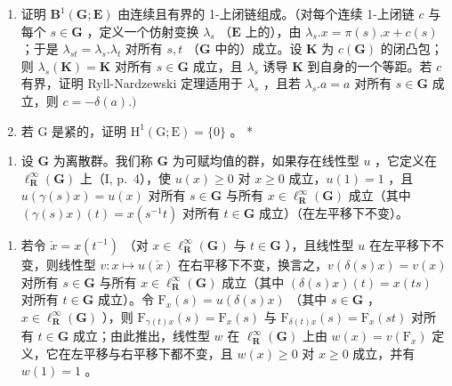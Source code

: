 \begin{enumerate}
\def\labelenumi{\alph{enumi})}
\item
  证明 \(\mathbf{B}^1 (\mathbf{G};\mathbf{E})\) 由连续且有界的 1-上闭链组成。（对每个连续 1-上闭链 \(c\) 与每个 \(s\in \mathbf{G}\) ，定义一个仿射变换 \(\lambda_{s}\) （\(\mathbf{E}\) 上的），由 \(\lambda_{s}.x = \pi (s).x + c(s)\) ；于是 \(\lambda_{st} = \lambda_s.\lambda_t\) 对所有 \(s,t\) （\(\mathbf{G}\) 中的）成立。设 \(\mathbf{K}\) 为 \(c(\mathbf{G})\) 的闭凸包；则 \(\lambda_s(\mathbf{K}) = \mathbf{K}\) 对所有 \(s\in \mathbf{G}\) 成立，且 \(\lambda_{s}\) 诱导 \(\mathbf{K}\) 到自身的一个等距。若 \(c\) 有界，证明 Ryll-Nardzewski 定理适用于 \(\lambda_{s}\) ，且若 \(\lambda_{s}.a = a\) 对所有 \(s\in \mathbf{G}\) 成立，则 \(c = -\delta (a).)\)
\item
  若 G 是紧的，证明 \(\mathrm{H}^1 (\mathrm{G};\mathrm{E}) = \{0\}\) 。 *
\end{enumerate}

\begin{enumerate}
\def\labelenumi{\arabic{enumi})}
\setcounter{enumi}{3}
\tightlist
\item
  设 \(\mathbf{G}\) 为离散群。我们称 \(\mathbf{G}\) 为可赋均值的群，如果存在线性型 \(u\) ，它定义在 \(\ell_{\mathbf{R}}^{\infty}(\mathbf{G})\) 上（I, p.~4），使 \(u(x) \geqslant 0\) 对 \(x \geqslant 0\) 成立，\(u(1) = 1\) ，且 \(u(\gamma(s)x) = u(x)\) 对所有 \(s \in \mathbf{G}\) 与所有 \(x \in \ell_{\mathbf{R}}^{\infty}(\mathbf{G})\) 成立（其中 \((\gamma(s)x)(t) = x(s^{-1}t)\) 对所有 \(t \in \mathbf{G}\) 成立）（在左平移下不变）。
\end{enumerate}

\begin{enumerate}
\def\labelenumi{\alph{enumi})}
\tightlist
\item
  若令 \(\check{x} = x(t^{-1})\) （对 \(x\in \ell_{\mathbf{R}}^{\infty}(\mathbf{G})\) 与 \(t\in \mathbf{G}\) ），且线性型 \(u\) 在左平移下不变，则线性型 \(v:x\mapsto u(\check{x})\) 在右平移下不变，换言之，\(v(\delta (s)x) = v(x)\) 对所有 \(s\in \mathbf{G}\) 与所有 \(x\in \ell_{\mathbf{R}}^{\infty}(\mathbf{G})\) 成立（其中 \((\delta (s)x)(t) = x(ts)\) 对所有 \(t\in \mathbf{G}\) 成立）。令 \(\mathrm{F}_x(s) = u(\delta (s)x)\) （其中 \(s\in \mathbf{G}\) ，\(x\in \ell_{\mathbf{R}}^{\infty}(\mathbf{G})\) ），则 \(\mathrm{F}_{\gamma (t)x}(s) = \mathrm{F}_x(s)\) 与 \(\mathrm{F}_{\delta (t)x}(s) = \mathrm{F}_x(st)\) 对所有 \(t\in \mathbf{G}\) 成立；由此推出，线性型 \(w\) 在 \(\ell_{\mathbf{R}}^{\infty}(\mathbf{G})\) 上由 \(w(x) = v(\mathrm{F}_x)\) 定义，它在左平移与右平移下都不变，且 \(w(x)\geqslant 0\) 对 \(x\geqslant 0\) 成立，并有 \(w(1) = 1\) 。
\end{enumerate}

